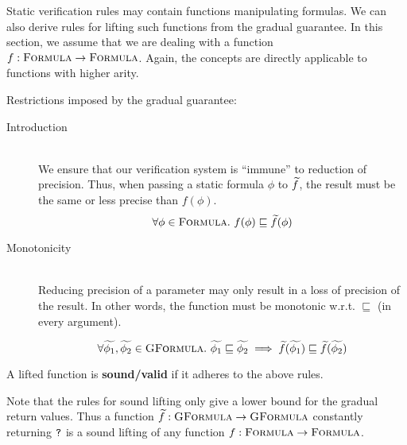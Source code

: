 
Static verification rules may contain functions manipulating formulas. %
We can also derive rules for lifting such functions from the gradual guarantee.
In this section, we assume that we are dealing with a function $f : \textsc{Formula} \rightarrow \textsc{Formula}$.
Again, the concepts are directly applicable to functions with higher arity.

Restrictions imposed by the gradual guarantee:
\begin{description}
    \item[Introduction]~\\
    We ensure that our verification system is “immune” to reduction of precision.
    Thus, when passing a static formula $\phi$ to $\widetilde{f}$, the result must be the same or less precise than $f(\phi)$.
    \begin{displaymath}
    \forall \phi \in \textsc{Formula}.~ f(\phi) \sqsubseteq \widetilde{f}(\phi)
    \end{displaymath}
    
    \item[Monotonicity]~\\
    Reducing precision of a parameter may only result in a loss of precision of the result.
    In other words, the function must be monotonic w.r.t. $\sqsubseteq$ (in every argument).
    
    \begin{displaymath}
    \forall \widetilde{\phi_1}, \widetilde{\phi_2} \in \textsc{GFormula}.~ 
    \widetilde{\phi_1} \sqsubseteq \widetilde{\phi_2} 
    \implies 
    \widetilde{f}(\widetilde{\phi_1}) \sqsubseteq \widetilde{f}(\widetilde{\phi_2})
    \end{displaymath}
\end{description}

\begin{definition}
    A lifted function is \textbf{sound/valid} if it adheres to the above rules.
\end{definition}

Note that the rules for sound lifting only give a lower bound for the gradual return values.
Thus a function $\widetilde{f} : \textsc{GFormula} \rightarrow \textsc{GFormula}$ constantly returning $\texttt{?}$ is a sound lifting of any function $f : \textsc{Formula} \rightarrow \textsc{Formula}$.

